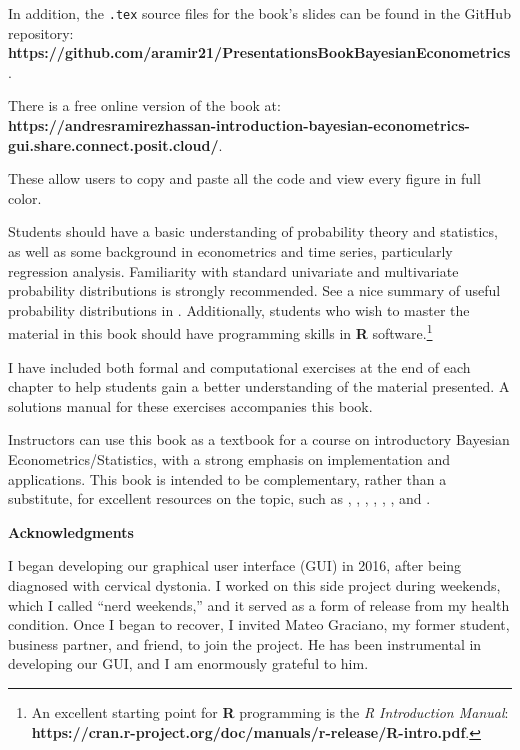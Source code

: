 In addition, the \texttt{.tex} source files for the book's slides can be found in the GitHub repository:\\
\textbf{https://github.com/aramir21/PresentationsBookBayesianEconometrics}. 

There is a free online version of the book at:\\
\textbf{https://andresramirezhassan-introduction-bayesian-econometrics-}\\
\textbf{gui.share.connect.posit.cloud/}.

These allow users to copy and paste all the code and view every figure in full color.

Students should have a basic understanding of probability theory and statistics, as well as some background in econometrics and time series, particularly regression analysis. Familiarity with standard univariate and multivariate probability distributions is strongly recommended. See a nice summary of useful probability distributions in \cite[p.~182-191]{greenberg2012introduction}. Additionally, students who wish to master the material in this book should have programming skills in \textbf{R} software.\footnote{An excellent starting point for \textbf{R} programming is the \textit{R Introduction Manual}: \textbf{https://cran.r-project.org/doc/manuals/r-release/R-intro.pdf}.}


I have included both formal and computational exercises at the end of each chapter to help students gain a better understanding of the material presented. A solutions manual for these exercises accompanies this book.

Instructors can use this book as a textbook for a course on introductory Bayesian Econometrics/Statistics, with a strong emphasis on implementation and applications. This book is intended to be complementary, rather than a substitute, for excellent resources on the topic, such as \cite{gelman2021bayesian}, \cite{chan2019bayesian}, \cite{rossi2012bayesian}, \cite{greenberg2012introduction}, \cite{geweke2005contemporary}, \cite{lancaster2004introduction}, and \cite{koop2003bayesian}.


\textbf{Acknowledgments}

I began developing our graphical user interface (GUI) in 2016, after being diagnosed with cervical dystonia. I worked on this side project during weekends, which I called ``nerd weekends,'' and it served as a form of release from my health condition. Once I began to recover, I invited Mateo Graciano, my former student, business partner, and friend, to join the project. He has been instrumental in developing our GUI, and I am enormously grateful to him. 


